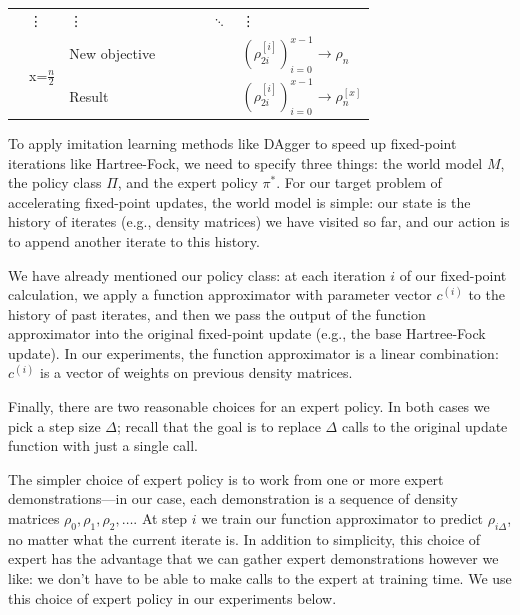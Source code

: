 \documentclass[twoside,11pt]{article}
\begin{document}
\begin{table}[htp!]
{\begin{tabular}{|l|l|l|l|l|l|l|l|}
	& \vdots      & \vdots      &                &                &                & $\ddots$ &   \vdots \\ \cline{2-8} 
	& \multirow{2}{*}{ x=$\frac{n}{2}$} & New objective         &                         &                          &                            &  & $(\rho_{2i}^{[i]})_{i=0}^{x-1} \rightarrow \rho_{n}$     \\ \cline{3-8} 
	&                & Result  &                &                &                &  & $(\rho_{2i}^{[i]})_{i=0}^{x-1}\rightarrow \rho_{n}^{[x]}$ \\ \hline
	\end{tabular}}
	\label{tab:DAgger}
	\end{table}
To apply imitation learning methods like DAgger to speed up fixed-point iterations like Hartree-Fock, we need to specify three things: the world model $M$, the policy class $\Pi$, and the expert policy $\pi^*$. For our target problem of accelerating fixed-point updates, the world model is simple: our state is the history of iterates (e.g., density matrices) we have visited so far, and our action is to append another iterate to this history.

We have already mentioned our policy class: at each iteration $i$ of our fixed-point calculation, we apply a function approximator with parameter vector $c^{(i)}$ to the history of past iterates, and then we pass the output of the function approximator into the original fixed-point update (e.g., the base Hartree-Fock update).  In our experiments, the function approximator is a linear combination: $c^{(i)}$ is a vector of weights on previous density matrices.  

Finally, there are two reasonable choices for an expert policy. In both cases we pick a step size $\Delta$; recall that the goal is to replace $\Delta$ calls to the original update function with just a single call.

The simpler choice of expert policy is to work from one or more expert demonstrations---in our case, each demonstration is a sequence of density matrices $\rho_0,\rho_1,\rho_2,\ldots$.  At step $i$ we train our function approximator to predict $\rho_{i \Delta}$, no matter what the current iterate is. In addition to simplicity, this choice of expert has the advantage that we can gather expert demonstrations however we like: we don't have to be able to make calls to the expert at training time. We use this choice of expert policy in our experiments below.
\end{document}
